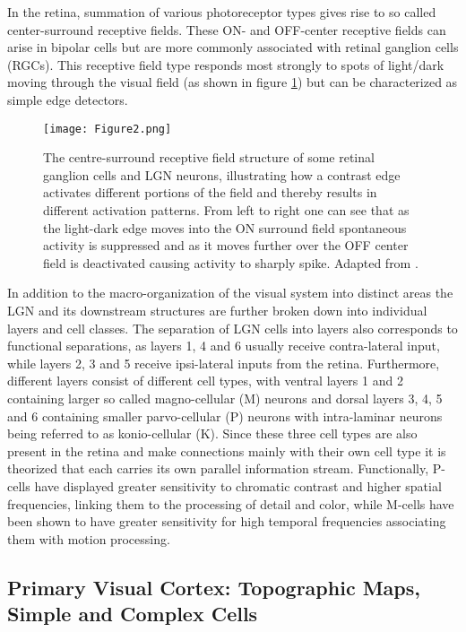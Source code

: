 In the retina, summation of various photoreceptor types gives rise to
so called center-surround receptive fields. These ON- and OFF-center
receptive fields can arise in bipolar cells but are more commonly
associated with retinal ganglion cells (RGCs). This receptive field
type responds most strongly to spots of light/dark moving through the
visual field (as shown in figure \ref{Center-Surround}) but can be
characterized as simple edge detectors.

\begin{figure}
	\centering \texttt{[image: Figure2.png]}
	\caption{The centre-surround receptive field
        structure of some retinal ganglion cells and LGN neurons,
        illustrating how a contrast edge activates different portions
        of the field and thereby results in different activation
        patterns. From left to right one can see that as the
        light-dark edge moves into the ON surround field spontaneous
        activity is suppressed and as it moves further over the OFF
        center field is deactivated causing activity to sharply
        spike. Adapted from \cite{Bear2006}.}
	\label{Center-Surround}
\end{figure}

In addition to the macro-organization of the visual system into
distinct areas the LGN and its downstream structures are further
broken down into individual layers and cell classes. The separation of
LGN cells into layers also corresponds to functional separations, as
layers 1, 4 and 6 usually receive contra-lateral input, while layers
2, 3 and 5 receive ipsi-lateral inputs from the retina. Furthermore,
different layers consist of different cell types, with ventral layers
1 and 2 containing larger so called magno-cellular (M) neurons and
dorsal layers 3, 4, 5 and 6 containing smaller parvo-cellular (P)
neurons with intra-laminar neurons being referred to as konio-cellular
(K). Since these three cell types are also present in the retina and
make connections mainly with their own cell type it is theorized that
each carries its own parallel information stream. Functionally,
P-cells have displayed greater sensitivity to chromatic contrast and
higher spatial frequencies, linking them to the processing of detail
and color, while M-cells have been shown to have greater sensitivity
for high temporal frequencies associating them with motion processing.

\subsection{Primary Visual Cortex: Topographic Maps, Simple and Complex Cells}

